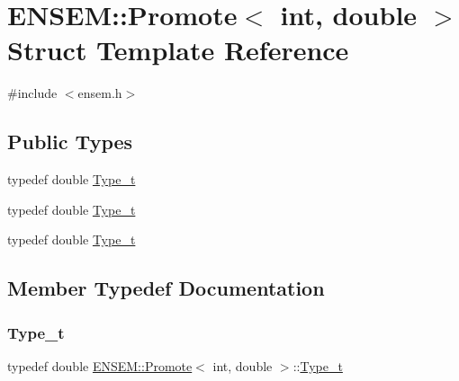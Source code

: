 \hypertarget{structENSEM_1_1Promote_3_01int_00_01double_01_4}{}\section{E\+N\+S\+EM\+:\+:Promote$<$ int, double $>$ Struct Template Reference}
\label{structENSEM_1_1Promote_3_01int_00_01double_01_4}


{\ttfamily \#include $<$ensem.\+h$>$}

\subsection*{Public Types}
\begin{DoxyCompactItemize}
\item 
typedef double \mbox{\hyperlink{structENSEM_1_1Promote_3_01int_00_01double_01_4_a9336b13a291d56af90484918a2f0ebe5}{Type\+\_\+t}}
\item 
typedef double \mbox{\hyperlink{structENSEM_1_1Promote_3_01int_00_01double_01_4_a9336b13a291d56af90484918a2f0ebe5}{Type\+\_\+t}}
\item 
typedef double \mbox{\hyperlink{structENSEM_1_1Promote_3_01int_00_01double_01_4_a9336b13a291d56af90484918a2f0ebe5}{Type\+\_\+t}}
\end{DoxyCompactItemize}


\subsection{Member Typedef Documentation}
\mbox{\label{structENSEM_1_1Promote_3_01int_00_01double_01_4_a9336b13a291d56af90484918a2f0ebe5}} 
\subsubsection{\texorpdfstring{Type\_t}{Type\_t}\hspace{0.1cm}{\footnotesize\ttfamily [1/3]}}
{\footnotesize\ttfamily typedef double \mbox{\hyperlink{structENSEM_1_1Promote}{E\+N\+S\+E\+M\+::\+Promote}}$<$ int, double $>$\+::\mbox{\hyperlink{structENSEM_1_1Promote_3_01int_00_01double_01_4_a9336b13a291d56af90484918a2f0ebe5}{Type\+\_\+t}}}

